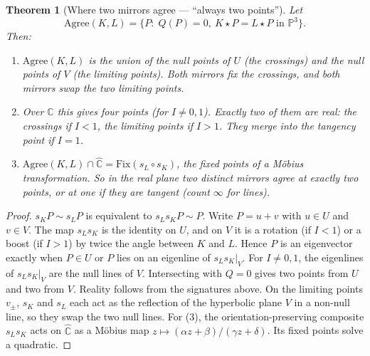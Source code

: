 \documentclass[10pt]{article}
\newtheorem{theorem}{Theorem}\newtheorem{proposition}[theorem]{Proposition}\newtheorem{lemma}[theorem]{Lemma}
\theoremstyle{definition}\newtheorem{definition}[theorem]{Definition}\newtheorem{remark}[theorem]{Remark}
\begin{document}
\begin{theorem}[Where two mirrors agree --- ``always two points'']\label{t:agree}
Let
\[\mathrm{Agree}(K,L)=\{P:\;Q(P)=0,\ K\star P = L\star P\text{ in }\mathbb P^3\}.\]
Then:
\begin{enumerate}
\item $\mathrm{Agree}(K,L)$ is the union of the null points of $U$ (the crossings) and the null points of $V$ (the limiting points). Both mirrors fix the crossings, and both mirrors swap the two limiting points.
\item Over $\mathbb C$ this gives four points (for $I\neq 0,1$). Exactly two of them are real: the crossings if $I<1$, the limiting points if $I>1$. They merge into the tangency point if $I=1$.
\item $\mathrm{Agree}(K,L)\cap\hat{\mathbb C}=\mathrm{Fix}(s_L\circ s_K)$, the fixed points of a Möbius transformation. So in the real plane two distinct mirrors agree at exactly two points, or at one if they are tangent (count $\infty$ for lines).
\end{enumerate}
\end{theorem}
\begin{proof}
$s_KP\sim s_LP$ is equivalent to $s_Ls_KP\sim P$.
Write $P=u+v$ with $u\in U$ and $v\in V$. The map $s_Ls_K$ is the identity on $U$, and on $V$ it is a rotation (if $I<1$) or a boost (if $I>1$) by twice the angle between $K$ and $L$. Hence $P$ is an eigenvector exactly when $P\in U$ or $P$ lies on an eigenline of $s_Ls_K|_V$.
For $I\neq0,1$, the eigenlines of $s_Ls_K|_V$ are the null lines of $V$. Intersecting with $Q=0$ gives two points from $U$ and two from $V$.
Reality follows from the signatures above. On the limiting points $v_\pm$, $s_K$ and $s_L$ each act as the reflection of the hyperbolic plane $V$ in a non-null line, so they swap the two null lines.
For (3), the orientation-preserving composite $s_Ls_K$ acts on $\hat{\mathbb C}$ as a Möbius map $z\mapsto(\alpha z+\beta)/(\gamma z+\delta)$. Its fixed points solve a quadratic.
\end{proof}
\end{document}

